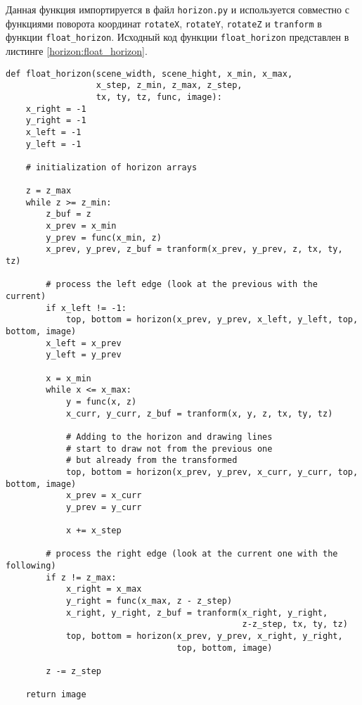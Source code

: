 \documentclass[oneside,final,14pt]{extreport}
\begin{document}
Данная функция импортируется в файл \texttt{horizon.py} и используется совместно с функциями поворота координат \texttt{rotateX}, \texttt{rotateY}, \texttt{rotateZ} и \texttt{tranform} в функции \verb:float_horizon:. Исходный код функции \verb:float_horizon: представлен в листинге \ref{horizon:float_horizon}.

\vfill

\begin{lstlisting}[caption = {Функция \texttt{float_horizon} -- использование алгоритма}, label = horizon:float_horizon]
def float_horizon(scene_width, scene_hight, x_min, x_max, 
                  x_step, z_min, z_max, z_step,
                  tx, ty, tz, func, image):
    x_right = -1
    y_right = -1
    x_left = -1
    y_left = -1

    # initialization of horizon arrays
    
    z = z_max
    while z >= z_min:
        z_buf = z
        x_prev = x_min
        y_prev = func(x_min, z)
        x_prev, y_prev, z_buf = tranform(x_prev, y_prev, z, tx, ty, tz)

        # process the left edge (look at the previous with the current)
        if x_left != -1:
            top, bottom = horizon(x_prev, y_prev, x_left, y_left, top, bottom, image)
        x_left = x_prev
        y_left = y_prev

        x = x_min
        while x <= x_max:
            y = func(x, z)
            x_curr, y_curr, z_buf = tranform(x, y, z, tx, ty, tz)

            # Adding to the horizon and drawing lines
            # start to draw not from the previous one 
            # but already from the transformed
            top, bottom = horizon(x_prev, y_prev, x_curr, y_curr, top, bottom, image)
            x_prev = x_curr
            y_prev = y_curr

            x += x_step

        # process the right edge (look at the current one with the following)
        if z != z_max:
            x_right = x_max
            y_right = func(x_max, z - z_step)
            x_right, y_right, z_buf = tranform(x_right, y_right, 
                                               z-z_step, tx, ty, tz)
            top, bottom = horizon(x_prev, y_prev, x_right, y_right, 
                                  top, bottom, image)

        z -= z_step

    return image
\end{lstlisting}
\end{document}
